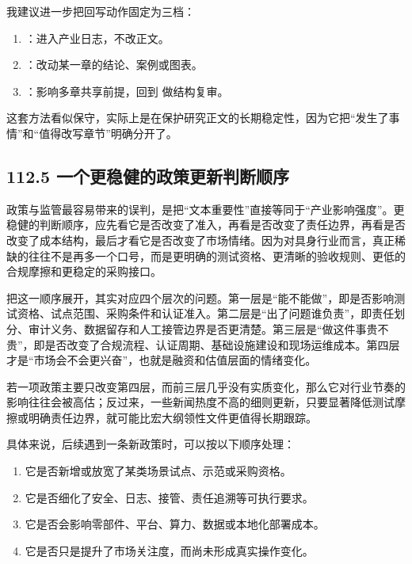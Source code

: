 我建议进一步把回写动作固定为三档：

\begin{enumerate}
\item \texttt{}：进入产业日志，不改正文。
\item \texttt{}：改动某一章的结论、案例或图表。
\item \texttt{}：影响多章共享前提，回到  做结构复审。
\end{enumerate}

这套方法看似保守，实际上是在保护研究正文的长期稳定性，因为它把“发生了事情”和“值得改写章节”明确分开了。

\subsection*{112.5 一个更稳健的政策更新判断顺序}


政策与监管最容易带来的误判，是把“文本重要性”直接等同于“产业影响强度”。更稳健的判断顺序，应先看它是否改变了准入，再看是否改变了责任边界，再看是否改变了成本结构，最后才看它是否改变了市场情绪。因为对具身行业而言，真正稀缺的往往不是再多一个口号，而是更明确的测试资格、更清晰的验收规则、更低的合规摩擦和更稳定的采购接口。

把这一顺序展开，其实对应四个层次的问题。第一层是“能不能做”，即是否影响测试资格、试点范围、采购条件和认证准入。第二层是“出了问题谁负责”，即责任划分、审计义务、数据留存和人工接管边界是否更清楚。第三层是“做这件事贵不贵”，即是否改变了合规流程、认证周期、基础设施建设和现场运维成本。第四层才是“市场会不会更兴奋”，也就是融资和估值层面的情绪变化。

若一项政策主要只改变第四层，而前三层几乎没有实质变化，那么它对行业节奏的影响往往会被高估；反过来，一些新闻热度不高的细则更新，只要显著降低测试摩擦或明确责任边界，就可能比宏大纲领性文件更值得长期跟踪。

具体来说，后续遇到一条新政策时，可以按以下顺序处理：

\begin{enumerate}
\item 它是否新增或放宽了某类场景试点、示范或采购资格。
\item 它是否细化了安全、日志、接管、责任追溯等可执行要求。
\item 它是否会影响零部件、平台、算力、数据或本地化部署成本。
\item 它是否只是提升了市场关注度，而尚未形成真实操作变化。
\end{enumerate}

